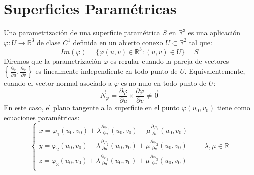 \section{Superficies Paramétricas}

\begin{definición} 
Una  parametrización de una superficie paramétrica $S$ en $\mathbb{R}^3$ es una aplicación $\varphi: U \to \mathbb{R}^3$ de clase $C^1$ definida en un abierto conexo $U \subset \mathbb{R}^2$ tal que:
$$ Im(\varphi) = \{ \varphi(u,v) \in \mathbb{R}^3 : (u,v) \in U \} = S $$
Diremos que la parametrización $\varphi$ es regular cuando la pareja de vectores $\left\{\frac{\partial \varphi}{\partial u}, \frac{\partial \varphi}{\partial v}\right\}$ es linealmente independiente en todo punto de $U$. Equivalentemente, cuando el vector normal asociado a $\varphi$ es no nulo en todo punto de $U$:
$$ \vec{N}_{\varphi} = \frac{\partial \varphi}{\partial u} \times \frac{\partial \varphi}{\partial v} \neq \vec{0} $$
En este caso, el plano tangente a la superficie en el punto $\varphi(u_0,v_0)$ tiene como ecuaciones paramétricas:
$$
    \begin{cases}
        x = \varphi_1(u_0,v_0) + \lambda \frac{\partial \varphi_1}{\partial u}(u_0,v_0) + \mu \frac{\partial \varphi_1}{\partial v}(u_0,v_0) \\
        y = \varphi_2(u_0,v_0) + \lambda \frac{\partial \varphi_2}{\partial u}(u_0,v_0) + \mu \frac{\partial \varphi_2}{\partial v}(u_0,v_0) \\
        z = \varphi_3(u_0,v_0) + \lambda \frac{\partial \varphi_3}{\partial u}(u_0,v_0) + \mu \frac{\partial \varphi_3}{\partial v}(u_0,v_0) \\
    \end{cases} \qquad \lambda, \mu \in \mathbb{R}
$$
\end{definición}


